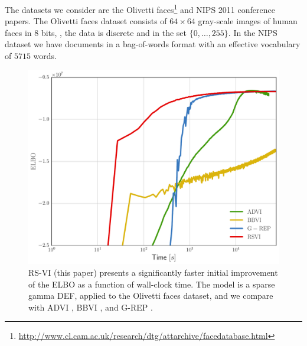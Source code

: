 The datasets we consider are the Olivetti faces\footnote{\url{http://www.cl.cam.ac.uk/research/dtg/attarchive/facedatabase.html}} and \gls{NIPS} 2011 conference papers. The Olivetti faces dataset consists of $64\times 64$ gray-scale images of human faces in $8$ bits, \ie, the data is discrete and in the set $\{0,\ldots,255\}$. In the \gls{NIPS} dataset we have documents in a bag-of-words format with an effective vocabulary of $5715$ words. 
\begin{figure}[t]
\centering
\includegraphics[width=0.9\columnwidth]{Olivette_time}
\caption{\gls{RS-VI} (this paper) presents a significantly faster initial improvement of the \gls{ELBO} as a function of wall-clock time. The model is a sparse gamma \gls{DEF}, applied to the Olivetti faces dataset, and we compare with \gls{ADVI} \citep{Kucukelbir2016}, \gls{BBVI} \citep{Ranganath2014}, and \gls{G-REP} \citep{RuizTB2016}. }\label{fig:olivetteDEF}
\end{figure}

